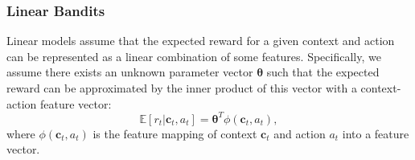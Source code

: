
\subsubsection{Linear Bandits}
Linear models assume that the expected reward for a given context and action can be represented as a linear combination of some features. Specifically, we assume there exists an unknown parameter vector $\boldsymbol{\theta}$ such that the expected reward can be approximated by the inner product of this vector with a context-action feature vector:
\begin{equation*}
    \mathbb{E}[r_t  \vert  \mathbf{c}_t, a_t] = \boldsymbol{\theta}^T \phi(\mathbf{c}_t, a_t),
\end{equation*}
where $\phi(\mathbf{c}_t, a_t)$ is the feature mapping of context $\mathbf{c}_t$ and action $a_t$ into a feature vector.

